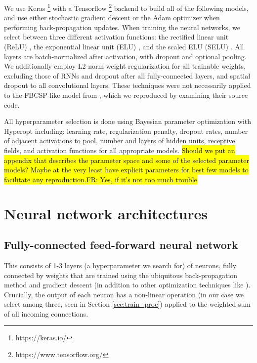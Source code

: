 \documentclass[utf8]{frontiersSCNS} %
\newcommand{\FR}[1]{{\small \textcolor{red}{\hl{FR: #1}}}}
\begin{document}
We use Keras \footnote{https://keras.io/} with a Tensorflow \footnote{https://www.tensorflow.org/} backend to build all of the following models, and use either stochastic gradient descent or the Adam optimizer  when performing back-propagation updates. When training the neural networks, we select between three different activation functions: the rectified linear unit (ReLU) \cite{He2015a}, the exponential linear unit (ELU) \cite{Clevert}, and the scaled ELU (SELU) \cite{NIPS2017_6698}. All layers are batch-normalized \cite{Szegedy2015} after activation, with dropout and optional pooling. We additionally employ L2-norm weight regularization for all trainable weights, excluding those of RNNs and dropout \cite{} after all fully-connected layers, and spatial dropout \cite{} to all convolutional layers. These techniques were not necessarily applied to the FBCSP-like model from \cite{Schirrmeister2017}, which we reproduced by examining their source code.

All hyperparameter selection is done using Bayesian parameter optimization with Hyperopt \cite{Bergstra2013}  including: learning rate, regularization penalty, dropout rates, number of adjacent activations to pool, number and layers of hidden units, receptive fields, and activation functions for all appropriate models. \hl{Should we put an appendix that describes the parameter space and some of the selected parameter models? Maybe at the very least have explicit parameters for best few models to facilitate any reproduction.}\FR{Yes, if it's not too much trouble}

\section{Neural network architectures}

\subsection{Fully-connected feed-forward neural network}

This consists of 1-3 layers (a hyperparameter we search for) of neurons, fully connected by weights that are trained using the ubiquitous back-propagation method \cite{Lecunn_phd, GoodfellowTextbook} and gradient descent (in addition to other optimization techniques like \cite{adam, rmsprop, etc}). Crucially, the output of each neuron has a non-linear operation (in our case we select among three, seen in Section \ref{sec:train_proc}) applied to the weighted sum of all incoming connections. %
\end{document}
